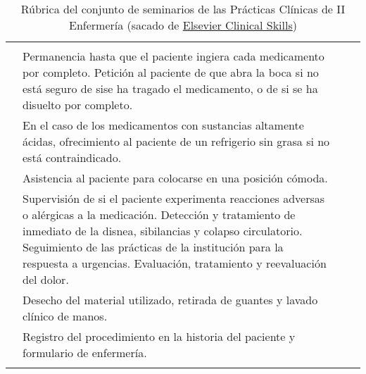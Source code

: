 \begin{landscape}
\begin{longtable}{N{0.15\textwidth}M{0.94\textwidth}|M{0.095\textwidth}M{0.22\textwidth}}
            & & \\  
            & Permanencia hasta que el paciente ingiera cada medicamento por completo. Petición al paciente de que abra la boca si no está seguro de sise ha tragado el medicamento, o de si se ha disuelto por completo.
            & & \\  
            & En el caso de los medicamentos con sustancias altamente ácidas, ofrecimiento al paciente de un refrigerio sin grasa si no está contraindicado.
            & & \\  
            & Asistencia al paciente para colocarse en una posición cómoda.
            & & \\  
            & Supervisión de si el paciente experimenta reacciones adversas o alérgicas a la medicación. Detección y tratamiento de inmediato de la disnea, sibilancias y colapso circulatorio. Seguimiento de las prácticas de la institución para la respuesta a urgencias. Evaluación, tratamiento y reevaluación del dolor.
            & & \\  
            & Desecho del material utilizado, retirada de guantes y lavado clínico de manos.
            & & \\  
            & Registro del procedimiento en la historia del paciente y formulario de enfermería.
            & & \\ \hline
        \caption[Rúbricas sacadas de Elsevier Clinical Skills]{Rúbrica del conjunto de seminarios de las Prácticas Clínicas de II Enfermería (sacado de \href{https://www-elsevierclinicalskills-es.bucm.idm.oclc.org/Inicio}{Elsevier Clinical Skills})}
        \label{tab:PlanXVII:RubricaElsevier}   
    \end{longtable}
\end{landscape}